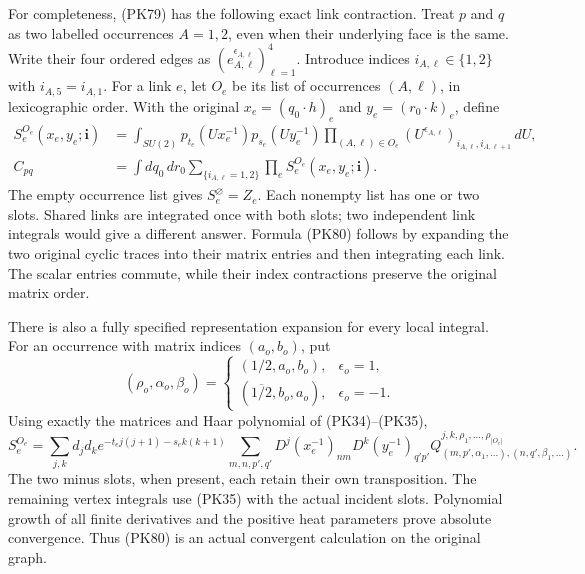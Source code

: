 \documentclass[11pt]{article}
\begin{document}
For completeness, (PK79) has the following exact link contraction.
Treat \(p\) and \(q\) as two labelled occurrences \(A=1,2\), even when
their underlying face is the same. Write their four ordered edges as
\((e_{A,\ell}^{\epsilon_{A,\ell}})_{\ell=1}^4\). Introduce indices
\(i_{A,\ell}\in\{1,2\}\) with \(i_{A,5}=i_{A,1}\).
For a link \(e\), let \(O_e\) be its list of occurrences \((A,\ell)\),
in lexicographic order. With the original \(x_e=(q_0\cdot h)_e\) and
\(y_e=(r_0\cdot k)_e\), define
\[
 \begin{split}
 S_e^{O_e}(x_e,y_e;\mathbf i)
 &=\int_{SU(2)}p_{t_e}(Ux_e^{-1})p_{s_e}(Uy_e^{-1})
   \prod_{(A,\ell)\in O_e}
       (U^{\epsilon_{A,\ell}})_{i_{A,\ell},i_{A,\ell+1}}\,dU,\\
 C_{pq}
 &=\int dq_0\,dr_0
   \sum_{\{i_{A,\ell}=1,2\}}
       \prod_e S_e^{O_e}(x_e,y_e;\mathbf i).
 \end{split}\tag{PK80}
\]
The empty occurrence list gives \(S_e^\varnothing=Z_e\).
Each nonempty list has one or two slots. Shared links are integrated
once with both slots; two independent link integrals would give a
different answer. Formula (PK80) follows by expanding the two original
cyclic traces into their matrix entries and then integrating each link.
The scalar entries commute, while their index contractions preserve
the original matrix order.

There is also a fully specified representation expansion for every
local integral. For an occurrence with matrix indices \((a_o,b_o)\),
put
\[
 (\rho_o,\alpha_o,\beta_o)=
 \begin{cases}
 (1/2,a_o,b_o),&\epsilon_o=1,\\
 (\overline{1/2},b_o,a_o),&\epsilon_o=-1 .
 \end{cases}
\]
Using exactly the matrices and Haar polynomial of (PK34)–(PK35),
\[
 S_e^{O_e}
 =\sum_{j,k}d_jd_k e^{-t_ej(j+1)-s_ek(k+1)}
 \sum_{m,n,p',q'}
 D^j(x_e^{-1})_{nm}D^k(y_e^{-1})_{q'p'}
 Q^{j,k,\rho_1,\ldots,\rho_{|O_e|}}_
 {(m,p',\alpha_1,\ldots),(n,q',\beta_1,\ldots)} .
 \tag{PK81}
\]
The two minus slots, when present, each retain their own transposition.
The remaining vertex integrals use (PK35) with the actual incident
slots. Polynomial growth of all finite derivatives and the positive
heat parameters prove absolute convergence. Thus (PK80) is an actual
convergent calculation on the original graph.
\end{document}
